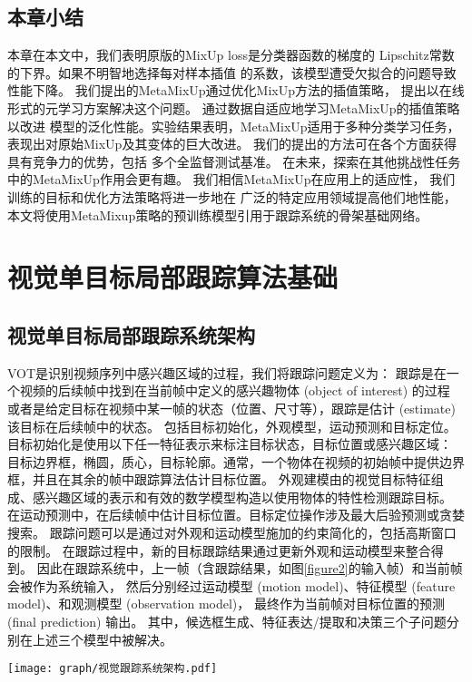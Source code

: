 \documentclass[promaster]{thesis-uestc}
\begin{document}
\section{本章小结}
本章在本文中，我们表明原版的MixUp loss是分类器函数的梯度的
Lipschitz常数的下界。如果不明智地选择每对样本插值
的系数，该模型遭受欠拟合的问题导致性能下降。
我们提出的MetaMixUp通过优化MixUp方法的插值策略，
提出以在线形式的元学习方案解决这个问题。
通过数据自适应地学习MetaMixUp的插值策略以改进
模型的泛化性能。实验结果表明，MetaMixUp适用于多种分类学习任务，表现出对原始MixUp及其变体的巨大改进。
我们的提出的方法可在各个方面获得具有竞争力的优势，包括
多个全监督测试基准。
在未来，探索在其他挑战性任务中的MetaMixUp作用会更有趣。
我们相信MetaMixUp在应用上的适应性，
我们训练的目标和优化方法策略将进一步地在
广泛的特定应用领域提高他们地性能，本文将使用MetaMixup策略的预训练模型引用于跟踪系统的骨架基础网络。

\chapter{视觉单目标局部跟踪算法基础}
\label{cap2}
\section{视觉单目标局部跟踪系统架构}
VOT是识别视频序列中感兴趣区域的过程，我们将跟踪问题定义为：
跟踪是在一个视频的后续帧中找到在当前帧中定义的感兴趣物体 (object of interest) 的过程
或者是给定目标在视频中某一帧的状态（位置、尺寸等），跟踪是估计 (estimate) 该目标在后续帧中的状态。
包括目标初始化，外观模型，运动预测和目标定位。目标初始化是使用以下任一特征表示来标注目标状态，目标位置或感兴趣区域：
目标边界框，椭圆，质心，目标轮廓。通常，一个物体在视频的初始帧中提供边界框，并且在其余的帧中跟踪算法估计目标位置。
外观建模由的视觉目标特征组成、感兴趣区域的表示和有效的数学模型构造以使用物体的特性检测跟踪目标。
在运动预测中，在后续帧中估计目标位置。目标定位操作涉及最大后验预测或贪婪搜索。
跟踪问题可以是通过对外观和运动模型施加的约束简化的，包括高斯窗口的限制。
在跟踪过程中，新的目标跟踪结果通过更新外观和运动模型来整合得到。
因此在跟踪系统中，上一帧（含跟踪结果，如图\ref{figure2}的输入帧）和当前帧会被作为系统输入，
然后分别经过运动模型 (motion model)、特征模型 (feature model)、和观测模型 (observation model)，
最终作为当前帧对目标位置的预测 (final prediction) 输出。
其中，候选框生成、特征表达/提取和决策三个子问题分别在上述三个模型中被解决。
\begin{figure*}[htp!]
	\centering  
	\texttt{[image: graph/视觉跟踪系统架构.pdf]}
    \caption{视觉跟踪系统架构图。}
	\label{figure2}
\end{figure*}
\end{document}
